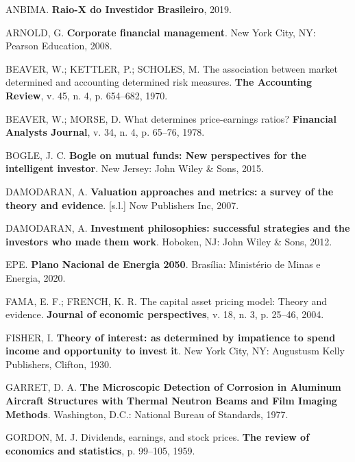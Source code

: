 \documentclass[grad,numbers]{coppe}
\newenvironment{cslreferences}%
  {}%
  {\par}
\begin{document}
  \hypertarget{refs}{}
  \begin{cslreferences}
  \leavevmode\hypertarget{ref-anbima2019}{}%
  ANBIMA. \textbf{Raio-X do Investidor Brasileiro}, 2019.

  \leavevmode\hypertarget{ref-arnold2008}{}%
  ARNOLD, G. \textbf{Corporate financial management}. New York City, NY: Pearson Education, 2008.

  \leavevmode\hypertarget{ref-beaver1970}{}%
  BEAVER, W.; KETTLER, P.; SCHOLES, M. The association between market determined and accounting determined risk measures. \textbf{The Accounting Review}, v. 45, n. 4, p. 654--682, 1970.

  \leavevmode\hypertarget{ref-beaver1978}{}%
  BEAVER, W.; MORSE, D. What determines price-earnings ratios? \textbf{Financial Analysts Journal}, v. 34, n. 4, p. 65--76, 1978.

  \leavevmode\hypertarget{ref-bogle2015}{}%
  BOGLE, J. C. \textbf{Bogle on mutual funds: New perspectives for the intelligent investor}. New Jersey: John Wiley \& Sons, 2015.

  \leavevmode\hypertarget{ref-damodaran2007}{}%
  DAMODARAN, A. \textbf{Valuation approaches and metrics: a survey of the theory and evidence}. {[}s.l.{]} Now Publishers Inc, 2007.

  \leavevmode\hypertarget{ref-damodaran2012}{}%
  DAMODARAN, A. \textbf{Investment philosophies: successful strategies and the investors who made them work}. Hoboken, NJ: John Wiley \& Sons, 2012.

  \leavevmode\hypertarget{ref-epe2020}{}%
  EPE. \textbf{Plano Nacional de Energia 2050}. Brasília: Ministério de Minas e Energia, 2020.

  \leavevmode\hypertarget{ref-fama2004}{}%
  FAMA, E. F.; FRENCH, K. R. The capital asset pricing model: Theory and evidence. \textbf{Journal of economic perspectives}, v. 18, n. 3, p. 25--46, 2004.

  \leavevmode\hypertarget{ref-fisher1930}{}%
  FISHER, I. \textbf{Theory of interest: as determined by impatience to spend income and opportunity to invest it}. New York City, NY: Augustusm Kelly Publishers, Clifton, 1930.

  \leavevmode\hypertarget{ref-techreport-exampleIn}{}%
  GARRET, D. A. \textbf{The Microscopic Detection of Corrosion in Aluminum Aircraft Structures with Thermal Neutron Beams and Film Imaging Methods}. Washington, D.C.: National Bureau of Standards, 1977.

  \leavevmode\hypertarget{ref-gordon1959}{}%
  GORDON, M. J. Dividends, earnings, and stock prices. \textbf{The review of economics and statistics}, p. 99--105, 1959.


\end{cslreferences}
\end{document}
